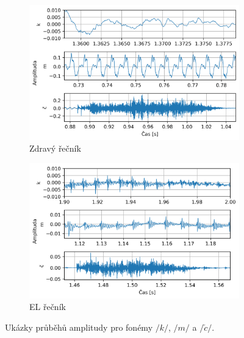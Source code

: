\begin{figure}[htpb]
  \centering
  \begin{subfigure}[b]{0.42\textwidth}
    \includegraphics[width=\textwidth]{./ch4-experiments/img/phonemes_normal.png}
    \caption{Zdravý řečník}
    \label{fig:experiments:analysis:phonemes:normal}
  \end{subfigure}
  \begin{subfigure}[b]{0.42\textwidth}
    \includegraphics[width=\textwidth]{./ch4-experiments/img/phonemes_el.png}
    \caption{EL řečník}
    \label{fig:experiments:analysis:phonemes:el}
  \end{subfigure}
  \caption{Ukázky průběhů amplitudy pro fonémy $/k/$, $/m/$ a $/\check{c}/$.}
  \label{fig:experiments:analysis:phonemes}
\end{figure}

